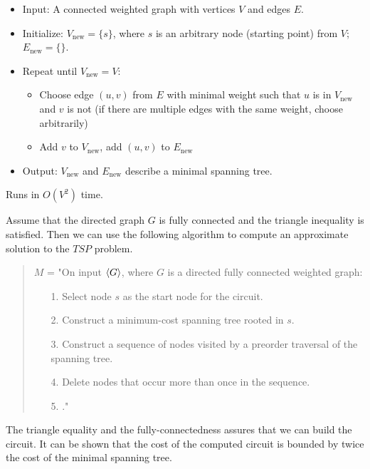 \documentclass[a4paper,blends,pdf,colorBG,slideColor]{prosper}
\begin{document}
\begin{itemize}
\item Input: A connected weighted graph with vertices $V$ and edges $E$.
\item Initialize: $V_{\text{new}} = \{s\}$, where $s$ is an arbitrary node (starting point) from $V$; $E_{\text{new}} = \{ \}$.
\item Repeat until $V_{\text{new}} = V$:
	\begin{itemize}
          \item Choose edge $(u,v)$ from $E$ with minimal weight such that $u$ is in $V_{\text{new}}$ and $v$ is not (if there are multiple edges with the same weight, choose arbitrarily)
          \item Add $v$ to $V_{\text{new}}$, add $(u, v)$ to $E_{\text{new}}$
	\end{itemize}
\item Output: $V_{\text{new}}$ and $E_{\text{new}}$ describe a minimal spanning tree.
\end{itemize}

Runs in $O(V^2)$ time.
\es



Assume that the directed graph $G$ is fully connected and the triangle inequality is satisfied.  Then we can use the following algorithm to
compute an approximate solution to the $TSP$ problem.

\begin{quote}
$M$ = "On input $\langle {G} \rangle$, where $G$ is a directed fully connected weighted graph:
\begin{itemize}
\item[1.] Select node $s$ as the start node for the circuit.
\item[2.] Construct a minimum-cost spanning tree rooted in $s$.
\item[3.] Construct a sequence of nodes visited by a preorder traversal of the spanning tree.
\item[4.] Delete nodes that occur more than once in the sequence.
\item[5.] \accept."
\end{itemize}
\end{quote}

The triangle equality and the fully-connectedness assures that we can build the circuit.  It can be shown that the cost of the computed circuit is bounded by twice the cost of the minimal spanning tree.

\es
\end{document}
